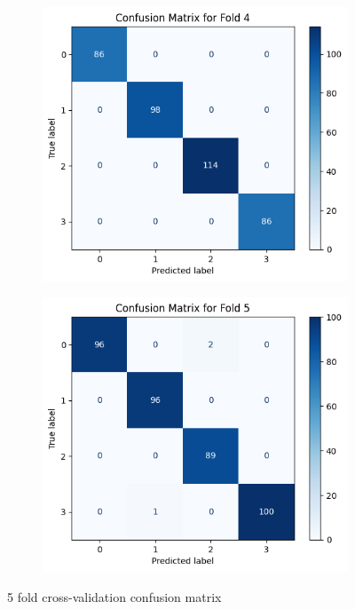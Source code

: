 \documentclass{article}
\begin{document}
\begin{figure}[H]
    \begin{subfigure}[b]{0.33\textwidth}
        \centering
        \includegraphics[width=\textwidth]{img/Q2/f4.png}
        \label{fig:image4}
    \end{subfigure}
    \hfill
    \begin{subfigure}[b]{0.33\textwidth}
        \centering
        \includegraphics[width=\textwidth]{img/Q2/f5.png}
        \label{fig:image5}
    \end{subfigure}
    
    \caption{5 fold cross-validation confusion matrix}
    \label{fig:five_images}
\end{figure}
\end{document}

